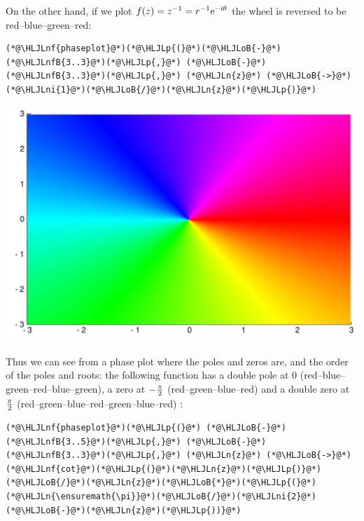 \documentclass[12pt,a4paper]{article}
\newcommand{\HLJLn}[1]{#1}
\newcommand{\HLJLnf}[1]{\textcolor[RGB]{66,102,213}{#1}}
\newcommand{\HLJLnfB}[1]{\textcolor[RGB]{59,151,46}{#1}}
\newcommand{\HLJLni}[1]{\textcolor[RGB]{59,151,46}{#1}}
\newcommand{\HLJLoB}[1]{\textcolor[RGB]{102,102,102}{\textbf{#1}}}
\newcommand{\HLJLp}[1]{#1}
\def\I{ {\rm i} }
\def\E{ {\rm e} }
\def\endash{–}
\begin{document}
On the other hand, if we plot $f(z) = z^{-1} = r^{-1} \E^{-\I \theta}$ the wheel is reversed to  be red\ensuremath{\endash}blue\ensuremath{\endash}green\ensuremath{\endash}red:


\begin{lstlisting}
(*@\HLJLnf{phaseplot}@*)(*@\HLJLp{(}@*)(*@\HLJLoB{-}@*)(*@\HLJLnfB{3..3}@*)(*@\HLJLp{,}@*) (*@\HLJLoB{-}@*)(*@\HLJLnfB{3..3}@*)(*@\HLJLp{,}@*) (*@\HLJLn{z}@*) (*@\HLJLoB{->}@*) (*@\HLJLni{1}@*)(*@\HLJLoB{/}@*)(*@\HLJLn{z}@*)(*@\HLJLp{)}@*)
\end{lstlisting}

\includegraphics[width=\linewidth]{figures/Lecture1_9_1.pdf}

Thus we can see from a phase plot where the poles and zeros are, and the order of the poles and roots: the following function has a double pole at 0 (red\ensuremath{\endash}blue\ensuremath{\endash}green\ensuremath{\endash}red\ensuremath{\endash}blue\ensuremath{\endash}green), a zero at $-{\pi \over 2}$ (red\ensuremath{\endash}green\ensuremath{\endash}blue\ensuremath{\endash}red) and a double zero at $\pi\over 2$ (red\ensuremath{\endash}green\ensuremath{\endash}blue\ensuremath{\endash}red\ensuremath{\endash}green\ensuremath{\endash}blue\ensuremath{\endash}red) :


\begin{lstlisting}
(*@\HLJLnf{phaseplot}@*)(*@\HLJLp{(}@*) (*@\HLJLoB{-}@*)(*@\HLJLnfB{3..5}@*)(*@\HLJLp{,}@*) (*@\HLJLoB{-}@*)(*@\HLJLnfB{3..3}@*)(*@\HLJLp{,}@*) (*@\HLJLn{z}@*) (*@\HLJLoB{->}@*) (*@\HLJLnf{cot}@*)(*@\HLJLp{(}@*)(*@\HLJLn{z}@*)(*@\HLJLp{)}@*)(*@\HLJLoB{/}@*)(*@\HLJLn{z}@*)(*@\HLJLoB{*}@*)(*@\HLJLp{(}@*)(*@\HLJLn{\ensuremath{\pi}}@*)(*@\HLJLoB{/}@*)(*@\HLJLni{2}@*)(*@\HLJLoB{-}@*)(*@\HLJLn{z}@*)(*@\HLJLp{))}@*)
\end{lstlisting}
\end{document}
